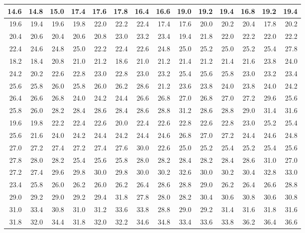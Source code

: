 \documentclass[
]{book}
\begin{document}
\begin{tabular}{r|r|r|r|r|r|r|r|r|r|r|r|r|r}
\hline
14.6 & 14.8 & 15.0 & 17.4 & 17.6 & 17.8 & 16.4 & 16.6 & 19.0 & 19.2 & 19.4 & 16.8 & 19.2 & 19.4\\
\hline
19.6 & 19.4 & 19.6 & 19.8 & 22.0 & 22.2 & 22.4 & 17.4 & 17.6 & 20.0 & 20.2 & 20.4 & 17.8 & 20.2\\
\hline
20.4 & 20.6 & 20.4 & 20.6 & 20.8 & 23.0 & 23.2 & 23.4 & 19.4 & 21.8 & 22.0 & 22.2 & 22.0 & 22.2\\
\hline
22.4 & 24.6 & 24.8 & 25.0 & 22.2 & 22.4 & 22.6 & 24.8 & 25.0 & 25.2 & 25.0 & 25.2 & 25.4 & 27.8\\
\hline
18.2 & 18.4 & 20.8 & 21.0 & 21.2 & 18.6 & 21.0 & 21.2 & 21.4 & 21.2 & 21.4 & 21.6 & 23.8 & 24.0\\
\hline
24.2 & 20.2 & 22.6 & 22.8 & 23.0 & 22.8 & 23.0 & 23.2 & 25.4 & 25.6 & 25.8 & 23.0 & 23.2 & 23.4\\
\hline
25.6 & 25.8 & 26.0 & 25.8 & 26.0 & 26.2 & 28.6 & 21.2 & 23.6 & 23.8 & 24.0 & 23.8 & 24.0 & 24.2\\
\hline
26.4 & 26.6 & 26.8 & 24.0 & 24.2 & 24.4 & 26.6 & 26.8 & 27.0 & 26.8 & 27.0 & 27.2 & 29.6 & 25.6\\
\hline
25.8 & 26.0 & 28.2 & 28.4 & 28.6 & 28.4 & 28.6 & 28.8 & 31.2 & 28.6 & 28.8 & 29.0 & 31.4 & 31.6\\
\hline
19.6 & 19.8 & 22.2 & 22.4 & 22.6 & 20.0 & 22.4 & 22.6 & 22.8 & 22.6 & 22.8 & 23.0 & 25.2 & 25.4\\
\hline
25.6 & 21.6 & 24.0 & 24.2 & 24.4 & 24.2 & 24.4 & 24.6 & 26.8 & 27.0 & 27.2 & 24.4 & 24.6 & 24.8\\
\hline
27.0 & 27.2 & 27.4 & 27.2 & 27.4 & 27.6 & 30.0 & 22.6 & 25.0 & 25.2 & 25.4 & 25.2 & 25.4 & 25.6\\
\hline
27.8 & 28.0 & 28.2 & 25.4 & 25.6 & 25.8 & 28.0 & 28.2 & 28.4 & 28.2 & 28.4 & 28.6 & 31.0 & 27.0\\
\hline
27.2 & 27.4 & 29.6 & 29.8 & 30.0 & 29.8 & 30.0 & 30.2 & 32.6 & 30.0 & 30.2 & 30.4 & 32.8 & 33.0\\
\hline
23.4 & 25.8 & 26.0 & 26.2 & 26.0 & 26.2 & 26.4 & 28.6 & 28.8 & 29.0 & 26.2 & 26.4 & 26.6 & 28.8\\
\hline
29.0 & 29.2 & 29.0 & 29.2 & 29.4 & 31.8 & 27.8 & 28.0 & 28.2 & 30.4 & 30.6 & 30.8 & 30.6 & 30.8\\
\hline
31.0 & 33.4 & 30.8 & 31.0 & 31.2 & 33.6 & 33.8 & 28.8 & 29.0 & 29.2 & 31.4 & 31.6 & 31.8 & 31.6\\
\hline
31.8 & 32.0 & 34.4 & 31.8 & 32.0 & 32.2 & 34.6 & 34.8 & 33.4 & 33.6 & 33.8 & 36.2 & 36.4 & 36.6\\
\hline
\end{tabular}
\end{document}
